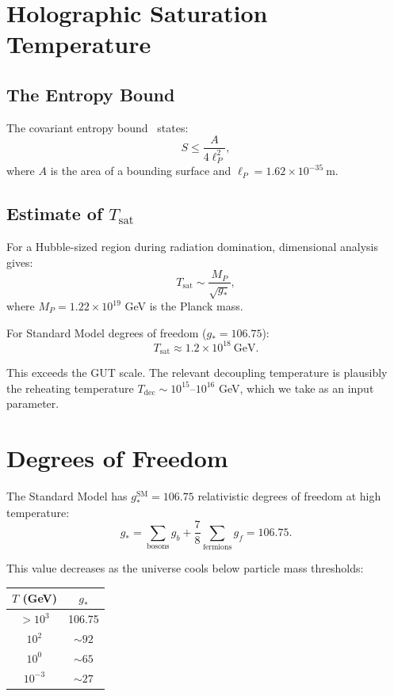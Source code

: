 \documentclass[11pt,a4paper]{article}
\begin{document}
\section{Holographic Saturation Temperature}

\subsection{The Entropy Bound}

The covariant entropy bound~\citep{Bousso02} states:
\begin{equation}
S \leq \frac{A}{4\ell_P^2},
\end{equation}
where $A$ is the area of a bounding surface and $\ell_P = 1.62 \times 10^{-35}~\mathrm{m}$.

\subsection{Estimate of $T_{\mathrm{sat}}$}

For a Hubble-sized region during radiation domination, dimensional analysis gives:
\begin{equation}
T_{\mathrm{sat}} \sim \frac{M_P}{\sqrt{g_*}},
\end{equation}
where $M_P = 1.22 \times 10^{19}$ GeV is the Planck mass.

For Standard Model degrees of freedom ($g_* = 106.75$):
\begin{equation}
T_{\mathrm{sat}} \approx 1.2 \times 10^{18}~\mathrm{GeV}.
\end{equation}

This exceeds the GUT scale. The relevant decoupling temperature is plausibly the reheating temperature $T_{\mathrm{dec}} \sim 10^{15}$--$10^{16}$ GeV, which we take as an input parameter.

\section{Degrees of Freedom}

The Standard Model has $g_*^{\mathrm{SM}} = 106.75$ relativistic degrees of freedom at high temperature:
\begin{equation}
g_* = \sum_{\mathrm{bosons}} g_b + \frac{7}{8}\sum_{\mathrm{fermions}} g_f = 106.75.
\end{equation}

This value decreases as the universe cools below particle mass thresholds:

\begin{center}
\begin{tabular}{cc}
\toprule
$T$ (GeV) & $g_*$ \\
\midrule
$>10^3$ & 106.75 \\
$10^2$ & $\sim 92$ \\
$10^0$ & $\sim 65$ \\
$10^{-3}$ & $\sim 27$ \\
\bottomrule
\end{tabular}
\end{center}
\end{document}
